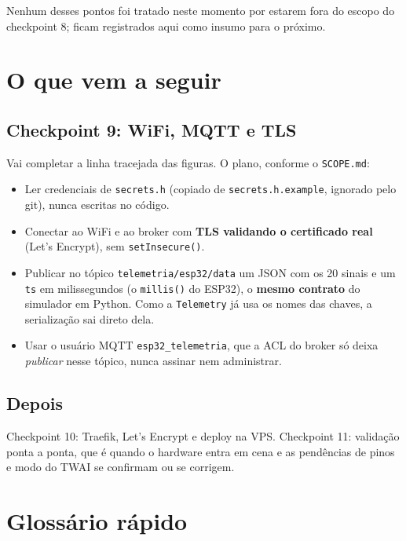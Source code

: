 \documentclass[11pt,a4paper]{article}
\begin{document}
Nenhum desses pontos foi tratado neste momento por estarem fora do escopo do checkpoint 8; ficam registrados aqui como insumo para o próximo.

\section{O que vem a seguir}

\subsection{Checkpoint 9: WiFi, MQTT e TLS}

Vai completar a linha tracejada das figuras. O plano, conforme o \texttt{SCOPE.md}:

\begin{itemize}
    \item Ler credenciais de \texttt{secrets.h} (copiado de \texttt{secrets.h.example}, ignorado pelo git), nunca escritas no código.
    \item Conectar ao WiFi e ao broker com \textbf{TLS validando o certificado real} (Let's Encrypt), sem \texttt{setInsecure()}.
    \item Publicar no tópico \texttt{telemetria/esp32/data} um JSON com os 20 sinais e um \texttt{ts} em milissegundos (o \texttt{millis()} do ESP32), o \textbf{mesmo contrato} do simulador em Python. Como a \texttt{Telemetry} já usa os nomes das chaves, a serialização sai direto dela.
    \item Usar o usuário MQTT \texttt{esp32\_telemetria}, que a ACL do broker só deixa \emph{publicar} nesse tópico, nunca assinar nem administrar.
\end{itemize}

\subsection{Depois}

Checkpoint 10: Traefik, Let's Encrypt e deploy na VPS. Checkpoint 11: validação ponta a ponta, que é quando o hardware entra em cena e as pendências de pinos e modo do TWAI se confirmam ou se corrigem.

\section{Glossário rápido}
\end{document}
